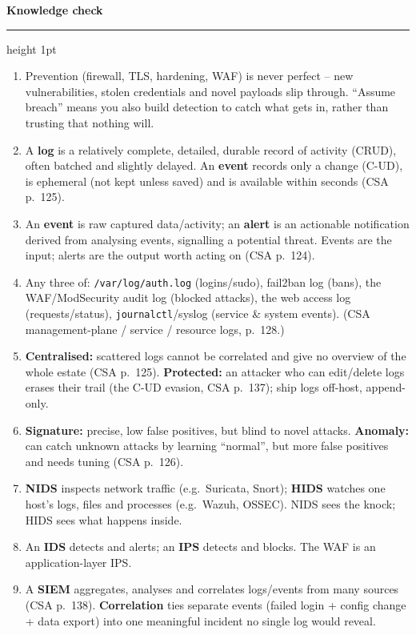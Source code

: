 \documentclass[11pt]{article}
\newcommand{\wbsection}[1]{\par\vspace{11pt}\noindent
  {\large\bfseries\color{kred}#1}\par\vspace{2pt}
  {\color{kred!35}\hrule height 1pt}\par\vspace{6pt}}
\renewcommand{\emph}[1]{\textup{#1}}
\newcommand{\cmd}[1]{\texttt{#1}}
\begin{document}
\wbsection{Knowledge check}
\begin{enumerate}
\item Prevention (firewall, TLS, hardening, WAF) is never perfect -- new vulnerabilities, stolen
      credentials and novel payloads slip through. ``Assume breach'' means you also build detection to
      catch what gets in, rather than trusting that nothing will.
\item A \textbf{log} is a relatively complete, detailed, durable record of activity (CRUD), often batched
      and slightly delayed. An \textbf{event} records only a change (C-UD), is ephemeral (not kept unless
      saved) and is available within seconds (CSA p.~125).
\item An \textbf{event} is raw captured data/activity; an \textbf{alert} is an \emph{actionable
      notification} derived from analysing events, signalling a potential threat. Events are the input;
      alerts are the output worth acting on (CSA p.~124).
\item Any three of: \cmd{/var/log/auth.log} (logins/sudo), fail2ban log (bans), the WAF/ModSecurity audit
      log (blocked attacks), the web access log (requests/status), \cmd{journalctl}/syslog (service \&
      system events). (CSA management-plane / service / resource logs, p.~128.)
\item \textbf{Centralised:} scattered logs cannot be correlated and give no overview of the whole estate
      (CSA p.~125). \textbf{Protected:} an attacker who can edit/delete logs erases their trail (the C-UD
      evasion, CSA p.~137); ship logs off-host, append-only.
\item \textbf{Signature:} precise, low false positives, but blind to novel attacks. \textbf{Anomaly:} can
      catch unknown attacks by learning ``normal'', but more false positives and needs tuning (CSA
      p.~126).
\item \textbf{NIDS} inspects network traffic (e.g.\ Suricata, Snort); \textbf{HIDS} watches one
      host's logs, files and processes (e.g.\ Wazuh, OSSEC). NIDS sees the knock; HIDS sees what happens
      inside.
\item An \textbf{IDS} detects and \emph{alerts}; an \textbf{IPS} detects and \emph{blocks}. The WAF is an
      application-layer IPS.
\item A \textbf{SIEM} aggregates, analyses and correlates logs/events from many sources (CSA p.~138).
      \textbf{Correlation} ties separate events (failed login + config change + data export) into one
      meaningful incident no single log would reveal.

\end{enumerate}
\end{document}

